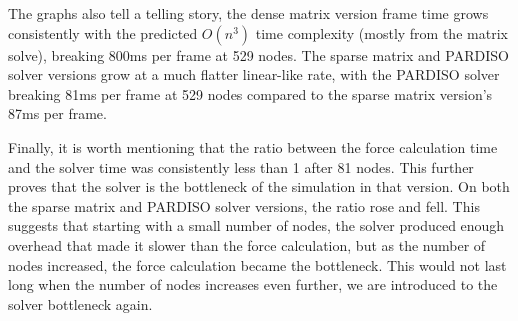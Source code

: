 \documentclass[letterpaper, 10 pt, conference]{ieeeconf}  %
\begin{document}
The graphs also tell a telling story, the dense matrix version frame time grows consistently with the predicted $O(n^3)$ time complexity (mostly from the matrix solve), breaking 800ms per frame at 529 nodes. The sparse matrix and PARDISO solver versions grow at a much flatter linear-like rate, with the PARDISO solver breaking 81ms per frame at 529 nodes compared to the sparse matrix version's 87ms per frame.

Finally, it is worth mentioning that the ratio between the force calculation time and the solver time was consistently less than 1 after 81 nodes. This further proves that the solver is the bottleneck of the simulation in that version. On both the sparse matrix and PARDISO solver versions, the ratio rose and fell. This suggests that starting with a small number of nodes, the solver produced enough overhead that made it slower than the force calculation, but as the number of nodes increased, the force calculation became the bottleneck. This would not last long when the number of nodes increases even further, we are introduced to the solver bottleneck again.
\end{document}
